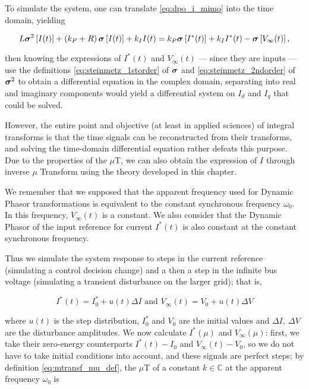 	To simulate the system, one can translate \eqref{eq:dpo_i_mimo} into the time domain, yielding

\begin{equation} L\boldsymbol{\sigma}^{2}\left[I(t)\right] + \left(k_P + R\right)\boldsymbol{\sigma}\left[I(t)\right] + k_I I(t) = k_P\boldsymbol{\sigma}\left[I^*(t)\right] + k_I I^*(t) - \boldsymbol{\sigma}\left[V_\infty(t)\right], \end{equation}

	\noindent then knowing the expressions of $I^*(t)$ and $V_\infty(t)$ — since they are inputs — use the definitions \eqref{eq:steinmetz_1storder} of $\boldsymbol{\sigma}$ and \eqref{eq:steinmetz_2ndorder} of $\boldsymbol{\sigma}^{2}$ to obtain a differential equation in the complex domain, separating into real and imaginary components would yield a differential system on $I_d$ and $I_q$ that could be solved.

	However, the entire point and objective (at least in applied sciences) of integral transforms is that the time signals can be reconstructed from their transforms, and solving the time-domain differential equation rather defeats this purpose. Due to the properties of the $\mu$T, we can also obtain the expression of $I$ through inverse $\mu$ Transform using the theory developed in this chapter.

	We remember that we supposed that the apparent frequency used for Dynamic Phasor transformations is equivalent to the constant synchronous frequency $\omega_0$. In this frequency, $V_\infty(t)$ is a constant. We also consider that the Dynamic Phasor of the input reference for current $I^*(t)$ is also constant at the constant synchronous frequency.

	Thus we simulate the system response to steps in the current reference (simulating a control decision change) and a then a step in the infinite bus voltage (simulating a transient disturbance on the larger grid); that is,

\begin{equation} I^*\left(t\right) = I_0^* + u(t)\Delta I \text{ and } V_\infty\left(t\right) =  V_0 + u(t)\Delta V \end{equation}

	\noindent where $u(t)$ is the step distribution, $I^*_0$ and $V_0$ are the initial values and $\Delta I,\ \Delta V$ are the disturbance amplitudes. We now calculate $I^*(\mu)$ and $V_\infty(\mu)$: first, we take their zero-energy counterparts $I^*(t) - I_0$ and $V_\infty(t) - V_0$, so we do not have to take initial conditions into account, and these signals are perfect steps; by definition \eqref{eq:mtransf_mu_def}, the $\mu$T of a constant $k\in\mathbb{C}$ at the apparent frequency $\omega_0$ is

